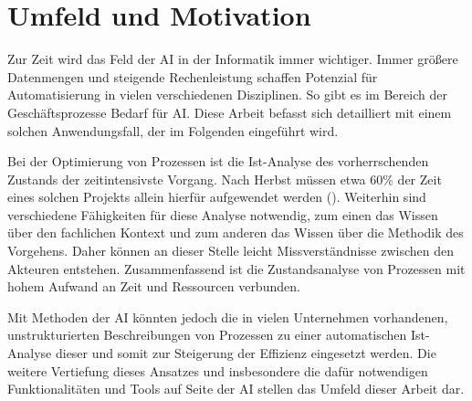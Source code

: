 \section{Umfeld und Motivation}

Zur Zeit wird das Feld der \ac{AI} in der Informatik immer wichtiger. Immer größere Datenmengen und steigende Rechenleistung schaffen Potenzial für Automatisierung in vielen verschiedenen Disziplinen. So gibt es im Bereich der Geschäftsprozesse Bedarf für AI. Diese Arbeit befasst sich detailliert mit einem solchen Anwendungsfall, der im Folgenden eingeführt wird.\par
Bei der Optimierung von Prozessen ist die Ist-Analyse des vorherrschenden Zustands der zeitintensivste Vorgang. Nach Herbst müssen etwa 60\% der Zeit eines solchen Projekts allein hierfür aufgewendet werden (\cite[vgl.][1]{HERBST}). 
Weiterhin sind verschiedene Fähigkeiten für diese Analyse notwendig, zum einen das Wissen über den fachlichen Kontext und zum anderen das Wissen über die Methodik des Vorgehens. Daher können an dieser Stelle leicht Missverständnisse zwischen den Akteuren entstehen. Zusammenfassend ist die Zustandsanalyse von Prozessen mit hohem Aufwand an Zeit und Ressourcen verbunden.\par
Mit Methoden der \ac{AI} könnten jedoch die in vielen Unternehmen vorhandenen, unstrukturierten Beschreibungen von Prozessen zu einer automatischen Ist-Analyse dieser und somit zur Steigerung der Effizienz eingesetzt werden. Die weitere Vertiefung dieses Ansatzes und insbesondere die dafür notwendigen Funktionalitäten und Tools auf Seite der \ac{AI} stellen das Umfeld dieser Arbeit dar.



